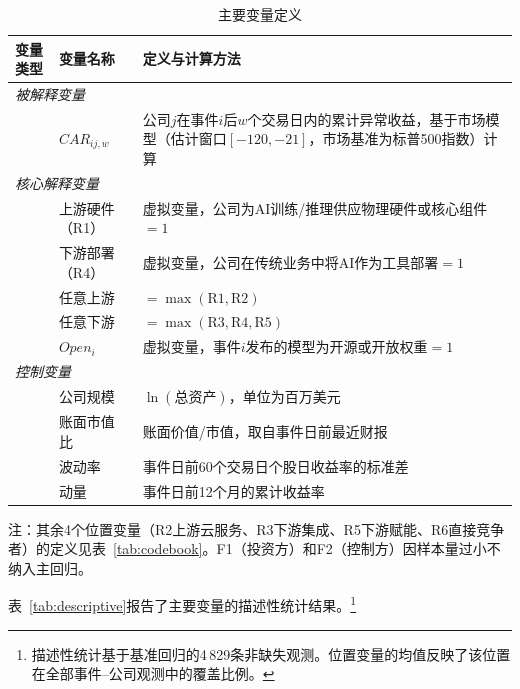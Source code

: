 \documentclass[11pt,fontset=fandol,a4paper]{ctexart}
\begin{document}
\begin{table}[H]
\centering
\small
\begin{threeparttable}
\caption{主要变量定义}
\label{tab:vardef}
\begin{tabular}{llp{7.5cm}}
\toprule
变量类型 & 变量名称 & 定义与计算方法 \\
\midrule
\multicolumn{3}{l}{\textit{被解释变量}} \\
 & $CAR_{ij,w}$ & 公司$j$在事件$i$后$w$个交易日内的累计异常收益，基于市场模型（估计窗口$[-120,-21]$，市场基准为标普500指数）计算 \\[3pt]
\multicolumn{3}{l}{\textit{核心解释变量}} \\
 & 上游硬件（R1） & 虚拟变量，公司为AI训练/推理供应物理硬件或核心组件$=1$ \\
 & 下游部署（R4） & 虚拟变量，公司在传统业务中将AI作为工具部署$=1$ \\
 & 任意上游 & $=\max(\text{R1},\text{R2})$ \\
 & 任意下游 & $=\max(\text{R3},\text{R4},\text{R5})$ \\
 & $Open_i$ & 虚拟变量，事件$i$发布的模型为开源或开放权重$=1$ \\[3pt]
\multicolumn{3}{l}{\textit{控制变量}} \\
 & 公司规模 & $\ln(\text{总资产})$，单位为百万美元 \\
 & 账面市值比 & 账面价值/市值，取自事件日前最近财报 \\
 & 波动率 & 事件日前60个交易日个股日收益率的标准差 \\
 & 动量 & 事件日前12个月的累计收益率 \\
\bottomrule
\end{tabular}
\begin{tablenotes}
\footnotesize
\item 注：其余4个位置变量（R2上游云服务、R3下游集成、R5下游赋能、R6直接竞争者）的定义见表~\ref{tab:codebook}。F1（投资方）和F2（控制方）因样本量过小不纳入主回归。
\end{tablenotes}
\end{threeparttable}
\end{table}

表~\ref{tab:descriptive}报告了主要变量的描述性统计结果。\footnote{描述性统计基于基准回归的4\,829条非缺失观测。位置变量的均值反映了该位置在全部事件--公司观测中的覆盖比例。}
\end{document}
